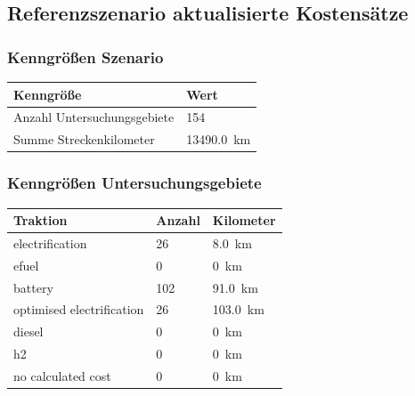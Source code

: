 \subsection{Referenzszenario aktualisierte Kostensätze}

\subsubsection{Kenngrößen Szenario}

\begin{center}
	\begin{tabularx}{\textwidth}{X | X } Kenngröße & Wert \\
	\hline
	Anzahl Untersuchungsgebiete & \num{154} \\
	Summe Streckenkilometer & \SI{13490.0}{\km}
	\end{tabularx}
\end{center}

\subsubsection{Kenngrößen Untersuchungsgebiete}
\begin{center}
	\begin{tabularx}{\textwidth}{X | X | X} Traktion & Anzahl & Kilometer \\
	\hline
            electrification & \num{26} &  \SI{8.0}{\km}\\
            efuel & \num{0} &  \SI{0}{\km}\\
            battery & \num{102} &  \SI{91.0}{\km}\\
            optimised electrification & \num{26} &  \SI{103.0}{\km}\\
            diesel & \num{0} &  \SI{0}{\km}\\
            h2 & \num{0} &  \SI{0}{\km}\\
            no calculated cost & \num{0} &  \SI{0}{\km}\\
    	\end{tabularx}
\end{center}

